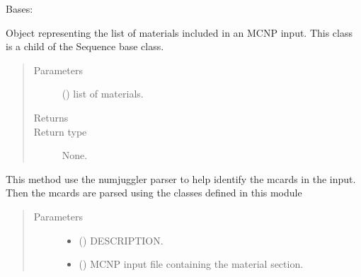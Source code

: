 \documentclass[letterpaper,10pt,english]{sphinxmanual}
\begin{document}
\begin{fulllineitems}
\label{\detokenize{api/inputgeneration:matreader.MatCardsList}}
Bases: 

Object representing the list of materials included in an MCNP input.
This class is a child of the Sequence base class.
\begin{quote}\begin{description}
\item[{Parameters}] \leavevmode
{} (\sphinxstyleliteralemphasis{\sphinxupquote{{[}}}{\hyperref[\detokenize{api/inputgeneration:matreader.Material}]{\sphinxcrossref{\sphinxstyleliteralemphasis{\sphinxupquote{Material}}}}}\sphinxstyleliteralemphasis{\sphinxupquote{{]}}}) \textendash{} list of materials.

\item[{Returns}] \leavevmode


\item[{Return type}] \leavevmode
None.

\end{description}\end{quote}

\begin{fulllineitems}
\label{\detokenize{api/inputgeneration:matreader.MatCardsList.from_input}}
This method use the numjuggler parser to help identify the mcards in
the input. Then the mcards are parsed using the classes defined in this
module
\begin{quote}\begin{description}
\item[{Parameters}] \leavevmode\begin{itemize}
\item {} 
 () \textendash{} DESCRIPTION.

\item {} 
 ({\hyperref[\detokenize{api/inputgeneration:inputfile.InputFile}]{}}) \textendash{} MCNP input file containing the material section.


\end{itemize}
\end{description}
\end{quote}
\end{fulllineitems}
\end{fulllineitems}
\end{document}
